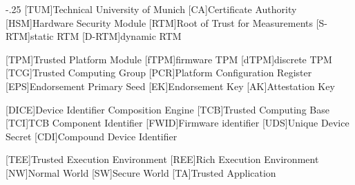 \documentclass[headsepline,footsepline,footinclude=false,fontsize=11pt,paper=a4,listof=totoc,bibliography=totoc,BCOR=12mm,DIV=12]{scrbook} %
\begin{document}


\frontmatter{}





\tableofcontents{}

\mainmatter{}

\acresetall{}

%








\appendix{}


\begin{acronym}
	\itemsep-.25\baselineskip
	[TUM]{Technical University of Munich}
	[CA]{Certificate Authority}
	[HSM]{Hardware Security Module}
	[RTM]{Root of Trust for Measurements}
	[S-RTM]{static \ac{RTM}}
	[D-RTM]{dynamic \ac{RTM}}

	[TPM]{Trusted Platform Module}
	[fTPM]{firmware TPM}
	[dTPM]{discrete TPM}
	[TCG]{Trusted Computing Group}
	[PCR]{Platform Configuration Register}
	[EPS]{Endorsement Primary Seed}
	[EK]{Endorsement Key}
	[AK]{Attestation Key}

	[DICE]{Device Identifier Composition Engine}
	[TCB]{Trusted Computing Base}
	[TCI]{TCB Component Identifier}
	[FWID]{Firmware identifier}
	[UDS]{Unique Device Secret}
	[CDI]{Compound Device Identifier}

	[TEE]{Trusted Execution Environment}
	[REE]{Rich Execution Environment}
	[NW]{Normal World}
	[SW]{Secure World}
	[TA]{Trusted Application}
\end{acronym}

\listoffigures{}
\listoftables{}
\printbibliography{}
\end{document}
